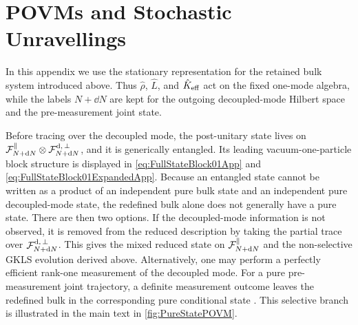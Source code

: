\documentclass{article}
\def\cF{{\cal F}}
\numberwithin{equation}{section}
\begin{document}
	\section{POVMs and Stochastic Unravellings}
	\label{appA:povm_unravellings}

	In this appendix we use the stationary representation for the retained bulk system introduced above. Thus \(\hat\rho\), \(\hat L\), and \(\hat K_{\rm eff}\) act on the fixed one-mode algebra, while the labels \(N+\dd N\) are kept for the outgoing decoupled-mode Hilbert space and the pre-measurement joint state.

	Before tracing over the decoupled mode, the post-unitary state lives on \(\cF_{N+\dd N}^\parallel\otimes\cF^{\rm d,\,\perp}_{N+\dd N} \), and it is generically entangled. Its leading vacuum-one-particle block structure is displayed in \cref{eq:FullStateBlock01App} and \eqref{eq:FullStateBlock01ExpandedApp}. Because an entangled state cannot be written as a product of an independent pure bulk state and an independent pure decoupled-mode state, the redefined bulk alone does not generally have a pure state. There are then two options. If the decoupled-mode information is not observed, it is removed from the reduced description by taking the partial trace over \(\cF^{\rm d,\,\perp}_{N+\dd N}\). This gives the mixed reduced state on \(\cF_{N+\dd N}^\parallel\) and the non-selective GKLS evolution derived above. Alternatively, one may perform a perfectly efficient rank-one measurement of the decoupled mode. For a pure pre-measurement joint trajectory, a definite measurement outcome leaves the redefined bulk in the corresponding pure conditional state \cite{wiseman2009quantum}. This selective branch is illustrated in the main text in \cref{fig:PureStatePOVM}.
\end{document}
